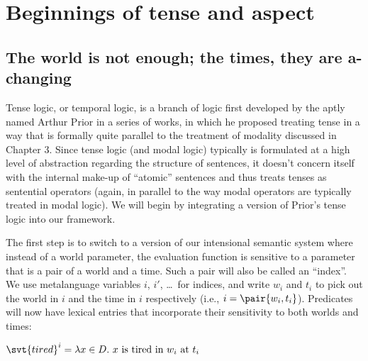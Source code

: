 \newcommand{\pres}{\textsc{pres}\xspace}
\newcommand{\past}{\textsc{past}\xspace}
\newcommand{\pfv}{\textsc{pfv}\xspace}
\newcommand{\prog}{\textsc{prog}\xspace}

\chapter{Beginnings of tense and aspect}\label{cha:tense-aspect}

\minitoc

\section{The world is not enough; the times, they are a-changing}
\label{sec:first-proposal}

%
Tense logic, or temporal logic, is a branch of logic first developed by the
aptly named Arthur Prior in a series of works, in which he proposed treating
tense in a way that is formally quite parallel to the treatment of modality
discussed in Chapter 3. Since tense logic (and modal logic) typically is
formulated at a high level of abstraction regarding the structure of sentences,
it doesn’t concern itself with the internal make-up of ``atomic'' sentences and
thus treats tenses as sentential operators (again, in parallel to the way modal
operators are typically treated in modal logic). We will begin by integrating a
version of Prior’s tense logic into our framework.

%
The first step is to switch to a version of our intensional semantic system
where instead of a world parameter, the evaluation function is sensitive to a
parameter that is a pair of a world and a time. Such a pair will also be called
an ``index''. We use metalanguage variables $i$, $i'$, \dots\ for indices, and
write $w_{i}$ and $t_{i}$ to pick out the world in $i$ and the time in $i$
respectively (i.e., $i = \pair{w_{i},t_{i}}$). Predicates will now have lexical
entries that incorporate their sensitivity to both worlds and times:

\ex $\svt{tired}^{i} = \lambda x\in D.\ x\ \text{is tired
  in}\ w_{i}\ \text{at}\ t_{i}$ \xe

